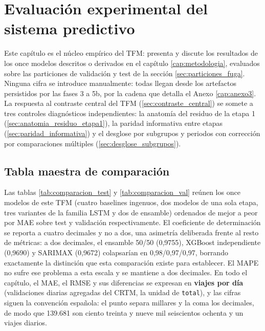 \chapter{Evaluación experimental del sistema predictivo}\label{cap:resultados}

Este capítulo es el núcleo empírico del TFM: presenta y discute los resultados de los
once modelos descritos o derivados en el capítulo \ref{cap:metodologia}, evaluados sobre
las particiones de validación y test de la sección \ref{sec:particiones_fuga}. Ninguna
cifra se introduce manualmente: todas llegan desde los artefactos persistidos por las
fases 3 a 5b, por la cadena que detalla el Anexo \ref{cap:anexo3}.
La respuesta al contraste central del TFM (\ref{sec:contraste_central}) se
somete a tres controles diagnósticos independientes: la anatomía del residuo de la etapa 1
(\ref{sec:anatomia_residuo_etapa1}), la paridad informativa entre etapas
(\ref{sec:paridad_informativa}) y el desglose por subgrupos y periodos con corrección por
comparaciones múltiples (\ref{sec:desglose_subgrupos}).

\section{Tabla maestra de comparación}\label{sec:tabla_maestra}

Las tablas \ref{tab:comparacion_test} y \ref{tab:comparacion_val} reúnen los once modelos
de este TFM (cuatro baselines ingenuos, dos modelos de una sola etapa, tres variantes de
la familia LSTM y dos de ensamble) ordenados de mejor a peor por MAE sobre test y
validación respectivamente. El coeficiente de determinación se reporta a cuatro decimales
y no a dos, una asimetría deliberada frente al resto de métricas: a dos decimales, el
ensamble 50/50 (0,9755), XGBoost independiente (0,9690) y SARIMAX (0,9672) colapsarían en
0,98/0,97/0,97, borrando exactamente la distinción que esta comparación existe para
establecer. El MAPE no sufre ese problema a esta escala y se mantiene a dos decimales. En todo el capítulo, el MAE, el
RMSE y sus diferencias se expresan en \textbf{viajes por día} (validaciones diarias
agregadas del CRTM, la unidad de \texttt{total}), y las cifras siguen la convención
española: el punto separa millares y la coma los decimales, de modo que 139.681 son
ciento treinta y nueve mil seiscientos ochenta y un viajes diarios.

\begin{table}[htbp]
  \centering
  \small
  \setlength{\tabcolsep}{4pt}
  \resizebox{\textwidth}{!}{}
  \caption{}
  \label{tab:comparacion_test}
\end{table}

